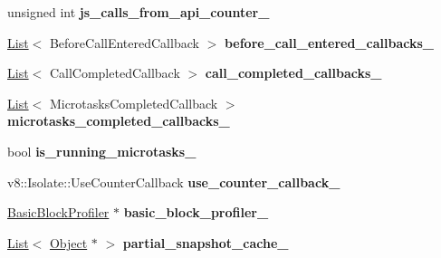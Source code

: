 \begin{DoxyCompactItemize}
\item 
unsigned int {\bfseries js\+\_\+calls\+\_\+from\+\_\+api\+\_\+counter\+\_\+}\hypertarget{classv8_1_1internal_1_1_isolate_aa67840f1542172df51ff349d6f1037aa}{}\label{classv8_1_1internal_1_1_isolate_aa67840f1542172df51ff349d6f1037aa}

\item 
\hyperlink{classv8_1_1internal_1_1_list}{List}$<$ Before\+Call\+Entered\+Callback $>$ {\bfseries before\+\_\+call\+\_\+entered\+\_\+callbacks\+\_\+}\hypertarget{classv8_1_1internal_1_1_isolate_a59c0d52030f2054fe894e5264ae41eec}{}\label{classv8_1_1internal_1_1_isolate_a59c0d52030f2054fe894e5264ae41eec}

\item 
\hyperlink{classv8_1_1internal_1_1_list}{List}$<$ Call\+Completed\+Callback $>$ {\bfseries call\+\_\+completed\+\_\+callbacks\+\_\+}\hypertarget{classv8_1_1internal_1_1_isolate_ad2d5e299a5d4eb2ecea075ccd6f6e090}{}\label{classv8_1_1internal_1_1_isolate_ad2d5e299a5d4eb2ecea075ccd6f6e090}

\item 
\hyperlink{classv8_1_1internal_1_1_list}{List}$<$ Microtasks\+Completed\+Callback $>$ {\bfseries microtasks\+\_\+completed\+\_\+callbacks\+\_\+}\hypertarget{classv8_1_1internal_1_1_isolate_a36de5faa47607110cae7b3b7a981e6aa}{}\label{classv8_1_1internal_1_1_isolate_a36de5faa47607110cae7b3b7a981e6aa}

\item 
bool {\bfseries is\+\_\+running\+\_\+microtasks\+\_\+}\hypertarget{classv8_1_1internal_1_1_isolate_a2c4d96b826105027abbf044d5786a2fb}{}\label{classv8_1_1internal_1_1_isolate_a2c4d96b826105027abbf044d5786a2fb}

\item 
v8\+::\+Isolate\+::\+Use\+Counter\+Callback {\bfseries use\+\_\+counter\+\_\+callback\+\_\+}\hypertarget{classv8_1_1internal_1_1_isolate_af979e12b85e328dd5684d7721afec146}{}\label{classv8_1_1internal_1_1_isolate_af979e12b85e328dd5684d7721afec146}

\item 
\hyperlink{classv8_1_1internal_1_1_basic_block_profiler}{Basic\+Block\+Profiler} $\ast$ {\bfseries basic\+\_\+block\+\_\+profiler\+\_\+}\hypertarget{classv8_1_1internal_1_1_isolate_a643a4b693baf267ebcd418f1fb94bd2f}{}\label{classv8_1_1internal_1_1_isolate_a643a4b693baf267ebcd418f1fb94bd2f}

\item 
\hyperlink{classv8_1_1internal_1_1_list}{List}$<$ \hyperlink{classv8_1_1internal_1_1_object}{Object} $\ast$ $>$ {\bfseries partial\+\_\+snapshot\+\_\+cache\+\_\+}\hypertarget{classv8_1_1internal_1_1_isolate_aa838b9274f0ff62060f159edb78bf296}{}\label{classv8_1_1internal_1_1_isolate_aa838b9274f0ff62060f159edb78bf296}


\end{DoxyCompactItemize}

